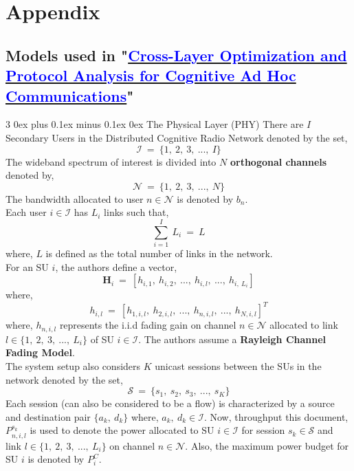 \documentclass[12pt, draftcls, onecolumn]{IEEEtran}
\makeatletter
\def\subsubsection{\@startsection{subsubsection}%
                                 {3}%
                                 {\z@}%
                                 {0ex plus 0.1ex minus 0.1ex}%
                                 {0ex}%
                                 {\normalfont\normalsize\bfseries}}%
\makeatother
\begin{document}
\section{Appendix}
\subsection{Models used in "\href{http://ieeexplore.ieee.org/stamp/stamp.jsp?tp=&arnumber=7859326&isnumber=7859429}{\textcolor{blue}{Cross-Layer Optimization and Protocol Analysis for Cognitive Ad Hoc Communications}}"}
\subsubsection{The Physical Layer (PHY)}
There are $I$ Secondary Users in the Distributed Cognitive Radio Network denoted by the set,
\[\mathcal{I}\ =\ \{1,\ 2,\ 3,\ ...,\ I\}\]
The wideband spectrum of interest is divided into $N$ \textbf{orthogonal channels} denoted by,
\[\mathcal{N}\ =\ \{1,\ 2,\ 3,\ ...,\ N\}\]
The bandwidth allocated to user $n \in \mathcal{N}$ is denoted by $b_n$.
\\Each user $i \in \mathcal{I}$ has $L_i$ links such that,
\[\sum_{i=1}^{I}\ L_i\ =\ L\]
where, $L$ is defined as the total number of links in the network.
\\For an SU $i$, the authors define a vector,
\[\textbf{H}_i\ =\ [h_{i,1},\ h_{i,2},\ ...,\ h_{i,l},\ ...,\ h_{i,\ L_i}]\]
where,
\[h_{i,l}\ =\ [h_{1,i,l},\ h_{2,i,l},\ ...,\ h_{n,i,l},\ ...,\ h_{N,i,l}]^T\]
where, $h_{n,i,l}$ represents the i.i.d fading gain on channel $n \in \mathcal{N}$ allocated to link $l \in \{1,\ 2,\ 3,\ ...,\ L_i\}$ of SU $i \in \mathcal{I}$. The authors assume a \textbf{Rayleigh Channel Fading Model}.
\\The system setup also considers $K$ unicast sessions between the SUs in the network denoted by the set,
\[\mathcal{S}\ =\ \{s_1,\ s_2,\ s_3,\ ...,\ s_K\}\]
Each session (can also be considered to be a flow) is characterized by a source and destination pair $\{a_k,\ d_k\}$ where, $a_k,\ d_k \in \mathcal{I}$.
Now, throughput this document, $P_{n,i,l}^{s_k}$ is used to denote the power allocated to SU $i \in \mathcal{I}$ for session $s_k \in \mathcal{S}$ and link $l \in \{1,\ 2,\ 3,\ ...,\ L_i\}$ on channel $n \in \mathcal{N}$. Also, the maximum power budget for SU $i$ is denoted by $P_i^C$.
\end{document}
